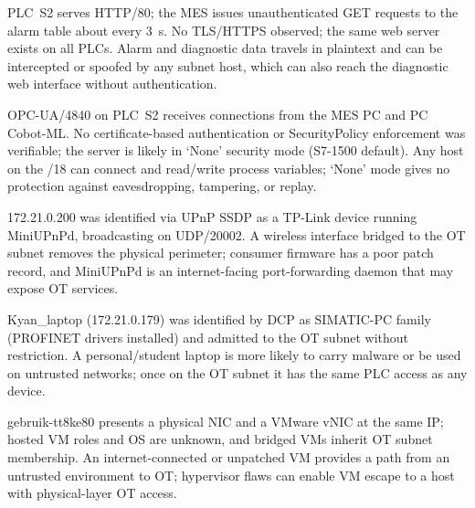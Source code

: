\documentclass{report}
\begin{document}
{PLC~S2 serves HTTP/80; the MES issues unauthenticated GET requests to the alarm table about every 3~s. No TLS/HTTPS observed; the same web server exists on all PLCs.}
{Alarm and diagnostic data travels in plaintext and can be intercepted or spoofed by any subnet host, which can also reach the diagnostic web interface without authentication.}

{OPC-UA/4840 on PLC~S2 receives connections from the MES PC and PC Cobot-ML. No certificate-based authentication or SecurityPolicy enforcement was verifiable; the server is likely in `None' security mode (S7-1500 default).}
{Any host on the /18 can connect and read/write process variables; `None' mode gives no protection against eavesdropping, tampering, or replay.}

{172.21.0.200 was identified via UPnP SSDP as a TP-Link device running MiniUPnPd, broadcasting on UDP/20002.}
{A wireless interface bridged to the OT subnet removes the physical perimeter; consumer firmware has a poor patch record, and MiniUPnPd is an internet-facing port-forwarding daemon that may expose OT services.}

\pagebreak

{Kyan\_laptop (172.21.0.179) was identified by DCP as SIMATIC-PC family (PROFINET drivers installed) and admitted to the OT subnet without restriction.}
{A personal/student laptop is more likely to carry malware or be used on untrusted networks; once on the OT subnet it has the same PLC access as any device.}

{gebruik-tt8ke80 presents a physical NIC and a VMware vNIC at the same IP; hosted VM roles and OS are unknown, and bridged VMs inherit OT subnet membership.}
{An internet-connected or unpatched VM provides a path from an untrusted environment to OT; hypervisor flaws can enable VM escape to a host with physical-layer OT access.}
\end{document}
